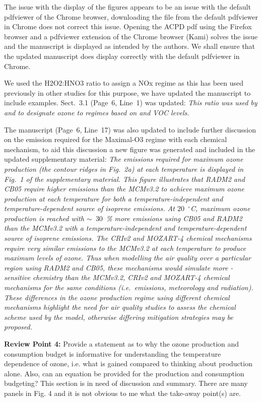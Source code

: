 \documentclass{article}
\DeclareRobustCommand*\degree{\ensuremath{^{\circ}}}
\begin{document}
The issue with the display of the figures appears to be an issue with the default pdfviewer of the Chrome browser, downloading the file from the default pdfviewer in Chrome does not correct this issue. Opening the ACPD pdf using the Firefox browser and a pdfviewer extension of the Chrome browser (Kami) solves the issue and the manuscript is displayed as intended by the authors. We shall ensure that the updated manuscript does display correctly with the default pdfviewer in Chrome.

We used the H2O2:HNO3 ratio to assign a NOx regime as this has been used previously in other studies for this purpose, we have updated the manuscript to include examples. Sect.~3.1 (Page~6, Line~1) was updated:
\textit{
This ratio was used by \citet{Sillman:1995} and \citet{Staffelbach:1997} to designate ozone to  regimes based on  and VOC levels. 
}

The manuscript (Page~6, Line~17) was also updated to include further discussion on the  emission required for the Maximal-O3 regime with each chemical mechanism, to aid this discussion a new figure was generated and included in the updated supplementary material:
\textit{
The  emissions required for maximum ozone production (the contour ridges in Fig.~2a) at each temperature is displayed in Fig.~1 of the supplementary material.
This figure illustrates that RADM2 and CB05 require higher  emissions than the MCMv3.2 to achieve maximum ozone production at each temperature for both a temperature-independent and temperature-dependent source of isoprene emissions.
At $20$~\degree C, maximum ozone production is reached with $\sim$~$30$~\% more  emissions using CB05 and RADM2 than the MCMv3.2 with a temperature-independent and temperature-dependent source of isoprene emissions.
The CRIv2 and MOZART-4 chemical mechanisms require very similar  emissions to the MCMv3.2 at each temperature to produce maximum levels of ozone.
Thus when modelling the air quality over a particular region using RADM2 and CB05, these mechanisms would simulate more -sensitive chemistry than the MCMv3.2, CRIv2 and MOZART-4 chemical mechanisms for the same conditions (i.e.~emissions, meteorology and radiation).
These differences in the ozone production regime using different chemical mechanisms highlight the need for air quality studies to assess the chemical scheme used by the model, otherwise differing mitigation strategies may be proposed.
}

\textbf{Review Point 4:}  Provide a statement as to why the ozone production and consumption budget is informative for understanding the temperature dependence of ozone, i.e.  what is gained compared to thinking about production alone. Also, can an equation be provided for the production and consumption budgeting? This section is in need of discussion and summary. There are many panels in Fig. 4 and it is not obvious to me what the take-away point(s) are.
\end{document}
